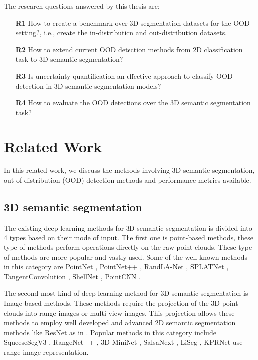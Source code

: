 \documentclass[thesis]{mas_proposal}
\begin{document}
The research questions answered by this thesis are:
\begin{itemize}
    \item[\textbf{R1}] How to create a benchmark over 3D segmentation datasets for the OOD setting?, i.e., create the in-distribution and out-distribution datasets.
    \item[\textbf{R2}] How to extend current OOD detection methods from 2D classification task to 3D semantic segmentation?
    \item[\textbf{R3}] Is uncertainty quantification an effective approach to classify OOD detection in 3D semantic segmentation models?
    \item[\textbf{R4}] How to evaluate the OOD detections over the 3D semantic segmentation task?
\end{itemize}
\section{Related Work}
In this related work, we discuss the methods involving 3D semantic segmentation, out-of-distribution (OOD) detection methods and performance metrics available.

\subsection{3D semantic segmentation}
The existing deep learning methods for 3D semantic segmentation is divided into 4 types based on their mode of input.
The first one is point-based methods, these type of methods perform operations directly on the raw point clouds. 
These type of methods are more popular and vastly used.
Some of the well-known methods in this category are PointNet \cite{Qi_2017_CVPR_pointnet}, PointNet++ \cite{qi2017pointnet++}, RandLA-Net \cite{Hu_2020_CVPR_Randla}, SPLATNet \cite{Su_2018_CVPR_splatnet}, TangentConvolution \cite{Tatarchenko_2018_CVPR_tangconv}, ShellNet \cite{Zhang_2019_ICCV_shellnet}, PointCNN \cite{li2018pointcnn}.

The second most kind of deep learning method for 3D semantic segmentation is Image-based methods.
These methods require the projection of the 3D point clouds into range images or multi-view images. 
This projection allows these methods to employ well developed and advanced 2D semantic segmentation methods like ResNet as in \cite{ulku2019survey}.
Popular methods in this category include SqueeseSegV3 \cite{Sequesesegv3_2018}, RangeNet++ \cite{Milioto2019}, 3D-MiniNet \cite{3Dmininet}, SalsaNext \cite{SalsaNext_2020}, LiSeg \cite{liseg}, KPRNet \cite{kochanov2020kprnet} use range image representation.
\end{document}
